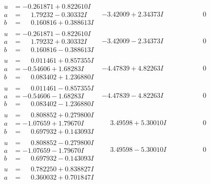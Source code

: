 \documentclass[1p]{elsarticle_modified}
\theoremstyle{definition}
\begin{document}
$$\begin{array}{c|c|c}
 \hline 
\begin{aligned}
u &= -0.261871 + 0.822610 I \\
a &= \phantom{-}1.79232 - 0.30332 I \\
b &= \phantom{-}0.160816 + 0.388613 I\end{aligned}
 & -3.42009 + 2.34373 I & \phantom{-0.000000 } 0 \\ \hline\begin{aligned}
u &= -0.261871 - 0.822610 I \\
a &= \phantom{-}1.79232 + 0.30332 I \\
b &= \phantom{-}0.160816 - 0.388613 I\end{aligned}
 & -3.42009 - 2.34373 I & \phantom{-0.000000 } 0 \\ \hline\begin{aligned}
u &= \phantom{-}0.011461 + 0.857355 I \\
a &= -0.54606 + 1.68283 I \\
b &= \phantom{-}0.083402 + 1.236880 I\end{aligned}
 & -4.47839 + 4.82263 I & \phantom{-0.000000 } 0 \\ \hline\begin{aligned}
u &= \phantom{-}0.011461 - 0.857355 I \\
a &= -0.54606 - 1.68283 I \\
b &= \phantom{-}0.083402 - 1.236880 I\end{aligned}
 & -4.47839 - 4.82263 I & \phantom{-0.000000 } 0 \\ \hline\begin{aligned}
u &= \phantom{-}0.808852 + 0.279800 I \\
a &= -1.07659 + 1.79670 I \\
b &= \phantom{-}0.697932 + 0.143093 I\end{aligned}
 & \phantom{-}3.49598 + 5.30010 I & \phantom{-0.000000 } 0 \\ \hline\begin{aligned}
u &= \phantom{-}0.808852 - 0.279800 I \\
a &= -1.07659 - 1.79670 I \\
b &= \phantom{-}0.697932 - 0.143093 I\end{aligned}
 & \phantom{-}3.49598 - 5.30010 I & \phantom{-0.000000 } 0 \\ \hline\begin{aligned}
u &= \phantom{-}0.782250 + 0.838827 I \\
a &= \phantom{-}0.360032 + 0.701847 I \\

\end{aligned}
\end{array}$$
\end{document}
